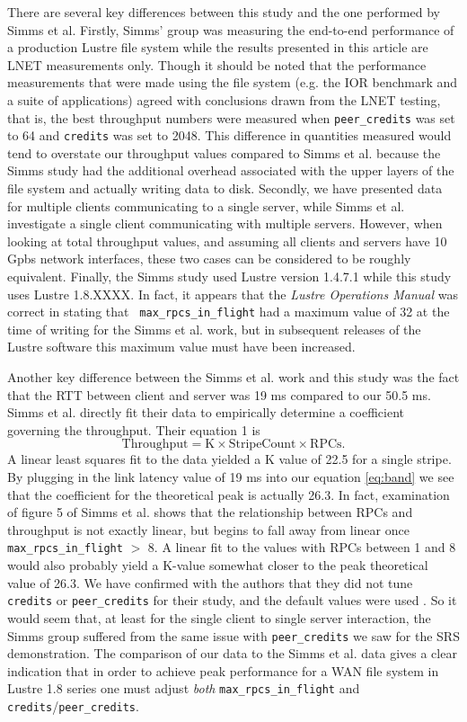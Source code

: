 \documentclass[]{sigplan-proc}
\begin{document}
There are several key differences between this study and the one performed by Simms et al. Firstly, Simms'
group was measuring the end-to-end performance of a production Lustre file system while the results presented
in this article are LNET measurements only. Though it should be noted that the performance measurements that
were made using the file system (e.g. the IOR benchmark and a suite of applications) agreed with conclusions
drawn from the LNET testing, that is, the best throughput numbers were measured when {\tt peer\_credits} was
set to 64 and {\tt credits} was set to 2048. This difference in quantities measured would tend to overstate
our throughput values compared to Simms et al. because the Simms study had the additional overhead associated
with the upper layers of the file system and actually writing data to disk. Secondly, we have presented data
for multiple clients communicating to a single server, while Simms et al. investigate a single client
communicating with multiple servers. However, when looking at total throughput values, and assuming all
clients and servers have 10 Gpbs network interfaces, these two cases can be considered to be roughly
equivalent. Finally, the Simms study used Lustre version 1.4.7.1 while this study uses Lustre 1.8.XXXX. In
fact, it appears that the {\it Lustre Operations Manual} was correct in stating that {\tt
  max\_rpcs\_in\_flight} had a maximum value of 32 at the time of writing for the Simms et al. work, but in
subsequent releases of the Lustre software this maximum value must have been increased.

Another key difference between the Simms et al. work and this study was the fact
that the RTT between client and server was 19 ms compared to our 50.5 ms. Simms et al. directly fit their data
to empirically determine a coefficient governing the throughput. Their equation 1 is
\begin{equation}
\mathrm{Throughput = K \times Stripe Count \times RPCs.}
\end{equation}
A linear least squares fit to the data yielded a K value of 22.5 for a single stripe. By plugging in the link
latency value of 19 ms into our equation \ref{eq:band} we see that the coefficient for the theoretical peak is
actually 26.3. In fact, examination of figure 5 of Simms et al. \cite{simms2007} shows that the relationship
between RPCs and throughput is not exactly linear, but begins to fall away from linear once {\tt
  max\_rpcs\_in\_flight} $>$ 8. A linear fit to the values with RPCs between 1 and 8 would also probably yield a
K-value somewhat closer to the peak theoretical value of 26.3. We have confirmed with the authors that they
did not tune {\tt credits} or {\tt peer\_credits} for their study, and the default values were used
\cite{simmsprivate}. So it would seem that, at least for the single client to single server interaction, the
Simms group suffered from the same issue with {\tt peer\_credits} we saw for the SRS demonstration. The
comparison of our data to the Simms et al. data gives a clear indication that in order to achieve peak
performance for a WAN file system in Lustre 1.8 series one must adjust {\it both} {\tt max\_rpcs\_in\_flight}
and {\tt credits}/{\tt peer\_credits}.
\end{document}
